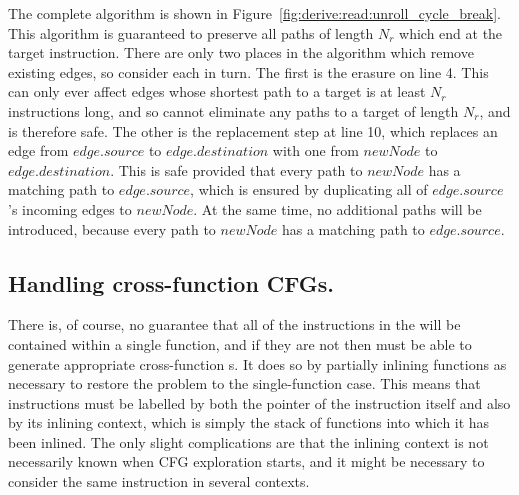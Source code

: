 The complete algorithm is shown in
Figure~\ref{fig:derive:read:unroll_cycle_break}.  This algorithm is
guaranteed to preserve all paths of length $N_r$ which end at the
target instruction.  There are only two places in the algorithm which
remove existing edges, so consider each in turn.  The first is the
erasure on line 4.  This can only ever affect edges whose shortest
path to a target is at least $N_r$ instructions long, and so cannot
eliminate any paths to a target of length $N_r$, and is therefore
safe.  The other is the replacement step at line 10, which replaces an
edge from $edge.source$ to $edge.destination$ with one from $newNode$
to $edge.destination$.  This is safe provided that every path to
$newNode$ has a matching path to $edge.source$, which is ensured by
duplicating all of $edge.source$'s incoming edges to $newNode$.  At
the same time, no additional paths will be introduced, because every
path to $newNode$ has a matching path to $edge.source$.


\subsection{Handling cross-function CFGs.}

\label{sect:derive:cross_function_cfgs}

There is, of course, no guarantee that all of the instructions in the
 will be contained within a single function,
and if they are not then {\technique} must be able to generate
appropriate cross-function s.  It does so by partially
inlining functions as necessary to restore the problem to the
single-function case.  This means that instructions must be labelled
by both the pointer of the instruction itself and also by its inlining
context, which is simply the stack of functions into which it has been
inlined.  The only slight complications
are that the inlining context is not necessarily known when CFG
exploration starts, and it might be necessary to consider the same
instruction in several contexts.


